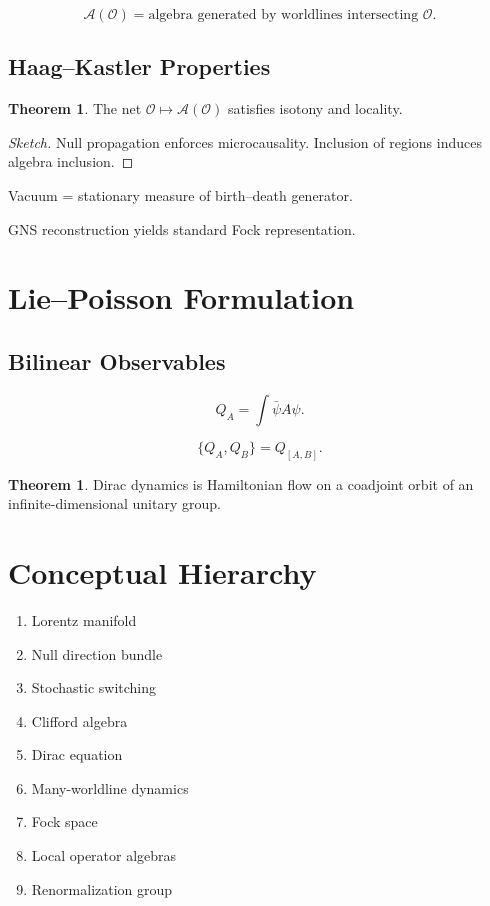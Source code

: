 \documentclass[11pt]{article}
\theoremstyle{definition}
\newtheorem{theorem}[definition]{Theorem}
\begin{document}
\[
\mathcal{A}(\mathcal{O})
=
\text{algebra generated by worldlines intersecting } \mathcal{O}.
\]

\subsection{Haag–Kastler Properties}

\begin{theorem}
The net $\mathcal{O}\mapsto \mathcal{A}(\mathcal{O})$
satisfies isotony and locality.
\end{theorem}

\begin{proof}[Sketch]
Null propagation enforces microcausality.
Inclusion of regions induces algebra inclusion.
\end{proof}

Vacuum = stationary measure of birth–death generator.

GNS reconstruction yields standard Fock representation.

\section{Lie–Poisson Formulation}

\subsection{Bilinear Observables}

\[
Q_A = \int \bar\psi A \psi.
\]

\[
\{Q_A,Q_B\} = Q_{[A,B]}.
\]

\begin{theorem}
Dirac dynamics is Hamiltonian flow on a coadjoint orbit
of an infinite-dimensional unitary group.
\end{theorem}

\section{Conceptual Hierarchy}

\begin{enumerate}
\item Lorentz manifold
\item Null direction bundle
\item Stochastic switching
\item Clifford algebra
\item Dirac equation
\item Many-worldline dynamics
\item Fock space
\item Local operator algebras
\item Renormalization group
\end{enumerate}
\end{document}
